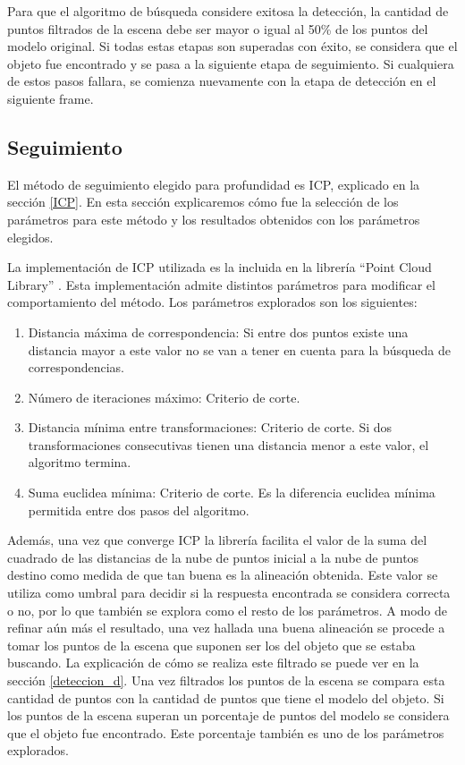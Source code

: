 Para que el algoritmo de búsqueda considere exitosa la detección, la cantidad de puntos filtrados de la escena debe ser mayor o igual al 50\% de los puntos del modelo original. Si todas estas etapas son superadas con éxito, se considera que el objeto fue encontrado y se pasa a la siguiente etapa de seguimiento. Si cualquiera de estos pasos fallara, se comienza nuevamente con la etapa de detección en el siguiente frame.


\subsection{Seguimiento}\label{tracking_d}
El método de seguimiento elegido para profundidad es ICP, explicado en la sección \ref{ICP}. En esta sección explicaremos cómo fue la selección de los parámetros para este método y los resultados obtenidos con los parámetros elegidos.

La implementación de ICP utilizada es la incluida en la librería ``Point Cloud Library'' \cite{Rusu_ICRA2011_PCL}. Esta implementación admite distintos parámetros para modificar el comportamiento del método. Los parámetros explorados son los siguientes:

\begin{enumerate}
	\item Distancia máxima de correspondencia: Si entre dos puntos existe una distancia mayor a este valor no se van a tener en cuenta para la búsqueda de correspondencias.
	\item Número de iteraciones máximo: Criterio de corte.
	\item Distancia mínima entre transformaciones: Criterio de corte. Si dos transformaciones consecutivas tienen una distancia menor a este valor, el algoritmo termina.
	\item Suma euclidea mínima: Criterio de corte. Es la diferencia euclidea mínima permitida entre dos pasos del algoritmo.
\end{enumerate}

Además, una vez que converge ICP la librería facilita el valor de la suma del cuadrado de las distancias de la nube de puntos inicial a la nube de puntos destino como medida de que tan buena es la alineación obtenida. Este valor se utiliza como umbral para decidir si la respuesta encontrada se considera correcta o no, por lo que también se explora como el resto de los parámetros. A modo de refinar aún más el resultado, una vez hallada una buena alineación se procede a tomar los puntos de la escena que suponen ser los del objeto que se estaba buscando. La explicación de cómo se realiza este filtrado se puede ver en la sección \ref{deteccion_d}. Una vez filtrados los puntos de la escena se compara esta cantidad de puntos con la cantidad de puntos que tiene el modelo del objeto. Si los puntos de la escena superan un porcentaje de puntos del modelo se considera que el objeto fue encontrado. Este porcentaje también es uno de los parámetros explorados.


